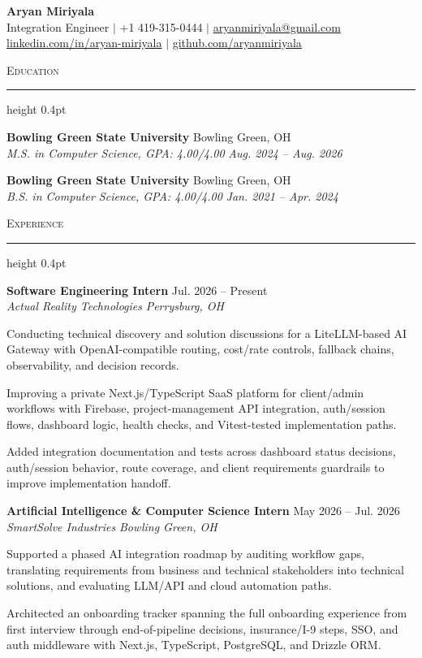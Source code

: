 \documentclass[letterpaper,11pt]{article}
\newcommand{\resumesection}[1]{%
  \par\vspace{2pt}%
  {\large\scshape #1}\par\vspace{2pt}%
  \hrule height 0.4pt\vspace{2pt}%
}
\newcommand{\resumeSubheading}[4]{
  \textbf{#1} \hfill #2\\
  \textit{#3} \hfill \textit{#4}
}
\begin{document}
\begin{center}
  {\LARGE \textbf{Aryan Miriyala}}\\[-1pt]
  \small
  Integration Engineer $|$
  +1 419-315-0444 $|$
  \href{mailto:aryanmiriyala@gmail.com}{aryanmiriyala@gmail.com}\\[-1pt]
  \href{https://www.linkedin.com/in/aryan-miriyala-7788a21b6/}{linkedin.com/in/aryan-miriyala} $|$
  \href{https://github.com/aryanmiriyala}{github.com/aryanmiriyala}
\end{center}\vspace{-10pt}

\resumesection{Education}
\resumeSubheading
{Bowling Green State University}{Bowling Green, OH}
{M.S. in Computer Science, GPA: 4.00/4.00}{Aug. 2024 -- Aug. 2026}

\resumeSubheading
{Bowling Green State University}{Bowling Green, OH}
{B.S. in Computer Science, GPA: 4.00/4.00}{Jan. 2021 -- Apr. 2024}

\resumesection{Experience}
\resumeSubheading
{Software Engineering Intern}{Jul. 2026 -- Present}
{Actual Reality Technologies}{Perrysburg, OH}
\begin{tightitemize}
  \item Conducting technical discovery and solution discussions for a LiteLLM-based AI Gateway with OpenAI-compatible routing, cost/rate controls, fallback chains, observability, and decision records.
  \item Improving a private Next.js/TypeScript SaaS platform for client/admin workflows with Firebase, project-management API integration, auth/session flows, dashboard logic, health checks, and Vitest-tested implementation paths.
  \item Added integration documentation and tests across dashboard status decisions, auth/session behavior, route coverage, and client requirements guardrails to improve implementation handoff.
\end{tightitemize}

\resumeSubheading
{Artificial Intelligence \& Computer Science Intern}{May 2026 -- Jul. 2026}
{SmartSolve Industries}{Bowling Green, OH}
\begin{tightitemize}
  \item Supported a phased AI integration roadmap by auditing workflow gaps, translating requirements from business and technical stakeholders into technical solutions, and evaluating LLM/API and cloud automation paths.
  \item Architected an onboarding tracker spanning the full onboarding experience from first interview through end-of-pipeline decisions, insurance/I-9 steps, SSO, and auth middleware with Next.js, TypeScript, PostgreSQL, and Drizzle ORM.
\end{tightitemize}
\end{document}
